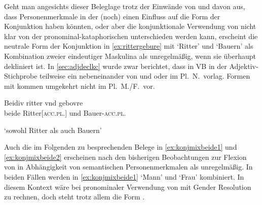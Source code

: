 Geht man angesichts dieser Beleglage trotz der Einwände von
\citet{gjelsten1980} und \citet{ksw2} davon aus, dass Personenmerkmale in der
\KC{} (noch) einen Einfluss auf die Form der Konjunktion haben
könnten, oder aber die konjunktionale Verwendung von  nicht
klar von der pronominal-kataphorischen unterschieden werden kann, erscheint
die neutrale Form der Konjunktion in \cref{ex:rittergebure} mit 
`Ritter' und  `Bauern' als Kombination zweier
eindeutiger Maskulina als unregelmäßig, wenn sie überhaupt dekliniert ist. In
\cref{sec:adjdeclkc} wurde zwar berichtet, dass in VB in der
Adjektiv-Stichprobe teilweise ein nebeneinander von  und 
oder  im Pl.~N.\ vorlag. Formen mit  kommen umgekehrt
nicht im Pl.~M./F.\ vor.

\begin{exe}
\ex\label{ex:rittergebure}
	\gll Beidiv ritter vnd gebovre \\
		beide Ritter[\textsc{acc.pl.\MascM}] und Bauer-\textsc{acc.pl.\MascM} \\
	\begin{taggedline}{\parencite[\pno~109va,29]{kc:VB}}
	\trans `sowohl Ritter als auch Bauern'
	\end{taggedline}
\end{exe}

Auch die im Folgenden zu besprechenden Belege in \cref{ex:konjmixbeide1} und
\cref{ex:konjmixbeide2} erscheinen nach den bisherigen Beobachtungen zur
Flexion von  in Abhängigkeit von semantischen Personenmerkmalen
als unregelmäßig. In beiden Fällen werden in \cref{ex:konjmixbeide1}
`Mann' und `Frau' kombiniert. In diesem Kontext wäre bei pronominaler
Verwendung von  mit Gender Resolution zu rechnen, doch steht
trotz allem die Form .

